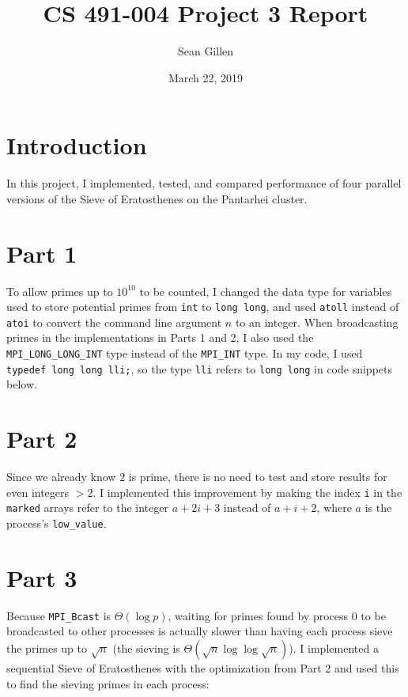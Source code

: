 \documentclass[12pt,letterpaper,oneside]{article}
\begin{document}
\title{CS 491-004 Project 3 Report}
\author{Sean Gillen}
\date{March 22, 2019}
\maketitle

\section*{Introduction}
In this project, I implemented, tested, and compared performance of four parallel versions of the Sieve of Eratosthenes on the Pantarhei cluster.

\section*{Part 1}
To allow primes up to $10^{10}$ to be counted, I changed the data type for variables used to store potential primes from \texttt{int} to \texttt{long long}, and used \texttt{atoll} instead of \texttt{atoi} to convert the command line argument $n$ to an integer. 
When broadcasting primes in the implementations in Parts 1 and 2, I also used the \texttt{MPI_LONG_LONG_INT} type instead of the \texttt{MPI_INT} type. In my code, I used \texttt{typedef long long lli;}, so the type \texttt{lli} refers to \texttt{long long} in code snippets below.

\section*{Part 2}
Since we already know $2$ is prime, there is no need to test and store results for even integers $>2$. I implemented this improvement by making the index \texttt{i} in the \texttt{marked} arrays refer to the integer $a+2i+3$ instead of $a+i+2$, where $a$ is the process's \texttt{low_value}.

\section*{Part 3}
Because \texttt{MPI_Bcast} is $\Theta(\log p)$, waiting for primes found by process 0 to be broadcasted to other processes is actually slower than having each process sieve the primes up to $\sqrt n$ (the sieving is $\Theta(\sqrt n\log\log \sqrt n)$). I implemented a sequential Sieve of Eratosthenes with the optimization from Part 2 and used this to find the sieving primes in each process:
\inputminted[tabsize=2,fontsize=\small]{c}{minisieve.c}
\end{document}
